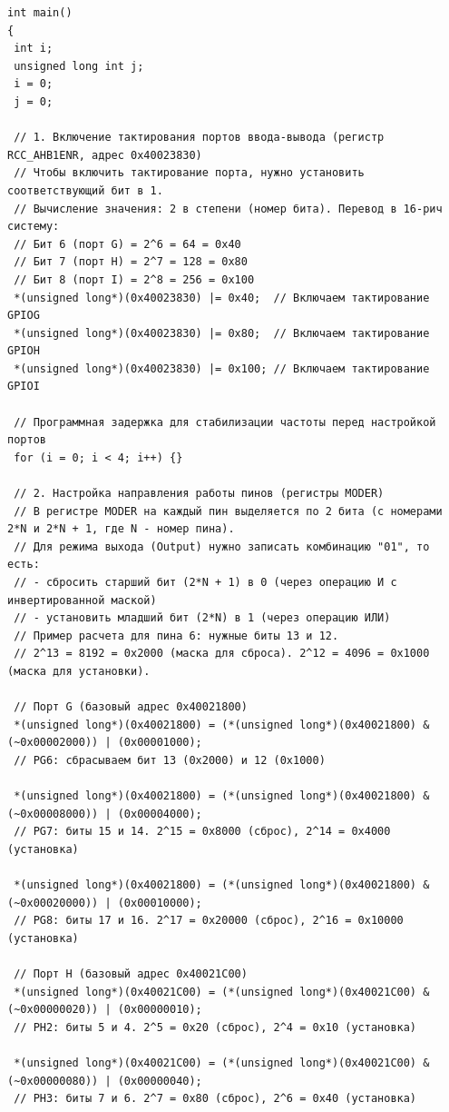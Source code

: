 \begin{lstlisting}[style=cstyle, caption={Основная функция программы}]
int main()
{
 int i;
 unsigned long int j;
 i = 0;
 j = 0;
 
 // 1. Включение тактирования портов ввода-вывода (регистр RCC_AHB1ENR, адрес 0x40023830)
 // Чтобы включить тактирование порта, нужно установить соответствующий бит в 1.
 // Вычисление значения: 2 в степени (номер бита). Перевод в 16-рич систему:
 // Бит 6 (порт G) = 2^6 = 64 = 0x40
 // Бит 7 (порт H) = 2^7 = 128 = 0x80
 // Бит 8 (порт I) = 2^8 = 256 = 0x100
 *(unsigned long*)(0x40023830) |= 0x40;  // Включаем тактирование GPIOG
 *(unsigned long*)(0x40023830) |= 0x80;  // Включаем тактирование GPIOH
 *(unsigned long*)(0x40023830) |= 0x100; // Включаем тактирование GPIOI
 
 // Программная задержка для стабилизации частоты перед настройкой портов
 for (i = 0; i < 4; i++) {}

 // 2. Настройка направления работы пинов (регистры MODER)
 // В регистре MODER на каждый пин выделяется по 2 бита (с номерами 2*N и 2*N + 1, где N - номер пина).
 // Для режима выхода (Output) нужно записать комбинацию "01", то есть:
 // - сбросить старший бит (2*N + 1) в 0 (через операцию И с инвертированной маской)
 // - установить младший бит (2*N) в 1 (через операцию ИЛИ)
 // Пример расчета для пина 6: нужные биты 13 и 12. 
 // 2^13 = 8192 = 0x2000 (маска для сброса). 2^12 = 4096 = 0x1000 (маска для установки).

 // Порт G (базовый адрес 0x40021800)
 *(unsigned long*)(0x40021800) = (*(unsigned long*)(0x40021800) & (~0x00002000)) | (0x00001000); 
 // PG6: сбрасываем бит 13 (0x2000) и 12 (0x1000)
 
 *(unsigned long*)(0x40021800) = (*(unsigned long*)(0x40021800) & (~0x00008000)) | (0x00004000); 
 // PG7: биты 15 и 14. 2^15 = 0x8000 (сброс), 2^14 = 0x4000 (установка)
 
 *(unsigned long*)(0x40021800) = (*(unsigned long*)(0x40021800) & (~0x00020000)) | (0x00010000); 
 // PG8: биты 17 и 16. 2^17 = 0x20000 (сброс), 2^16 = 0x10000 (установка)
    
 // Порт H (базовый адрес 0x40021C00)
 *(unsigned long*)(0x40021C00) = (*(unsigned long*)(0x40021C00) & (~0x00000020)) | (0x00000010); 
 // PH2: биты 5 и 4. 2^5 = 0x20 (сброс), 2^4 = 0x10 (установка)
 
 *(unsigned long*)(0x40021C00) = (*(unsigned long*)(0x40021C00) & (~0x00000080)) | (0x00000040); 
 // PH3: биты 7 и 6. 2^7 = 0x80 (сброс), 2^6 = 0x40 (установка)
 

\end{lstlisting}
